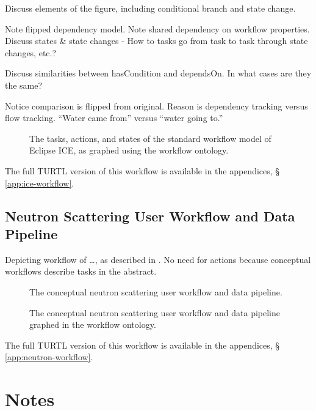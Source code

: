 Discuss elements of the figure, including conditional branch and state change.

Note flipped dependency model. Note shared dependency on workflow properties.
Discuss states \& state changes - How to tasks go from task to task through
state changes, etc.?

Discuss similarities between hasCondition and dependsOn. In what cases are they
the same?

Notice comparison is flipped from original. Reason is dependency tracking versus
flow tracking. ``Water came from'' versus ``water going to.''

\begin{figure}[htbp]
\centering
{}
\caption{The tasks, actions, and states of the standard workflow model of
Eclipse ICE, as graphed using the workflow ontology.}
\label{ice-workflow}
\end{figure}

The full TURTL version of this workflow is available in the appendices, \S
\ref{app:ice-workflow}.

\subsection{Neutron Scattering User Workflow and Data Pipeline}

Depicting workflow of \ldots, as described in \cite{sns-hfir-data-review}. No
need for actions because conceptual workflows describe tasks in the abstract.

\begin{figure}[htbp]
\centering
{}
\caption{The conceptual neutron scattering user workflow and data pipeline.}
\label{neutron-workflow}
\end{figure}

\begin{figure}[htbp]
\centering
{}
\caption{The conceptual neutron scattering user workflow and data pipeline
graphed in the workflow ontology.}
\label{neutron-workflow-graph}
\end{figure}

The full TURTL version of this workflow is available in the appendices, \S
\ref{app:neutron-workflow}.

\section{Notes}

